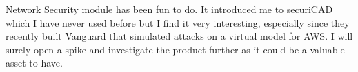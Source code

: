 Network Security module has been fun to do. It introduced me to securiCAD which
I have never used before but I find it very interesting, especially since they
recently built Vanguard that simulated attacks on a virtual model for AWS.
I will surely open a spike and investigate the product further as it could be
a valuable asset to have.
